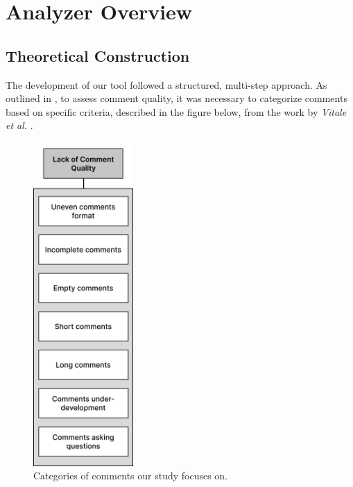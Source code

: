 
\chapter{Analyzer Overview} %

\label{Chapter3}

\section{Theoretical Construction}
The development of our tool followed a structured, multi-step approach. As outlined in , to assess comment quality, it was necessary to categorize comments based on specific criteria, described in the figure below, from the work by \textit{Vitale et al.} \cite{dsCT}.

\begin{figure}[ht]
	\centering\includegraphics[height=350pt]{figs/goal-schema.PNG}
	\captionsetup{justification=centering}
	\caption{Categories of comments our study focuses on.}
	\label{fig:goal-schema}
\end{figure}

